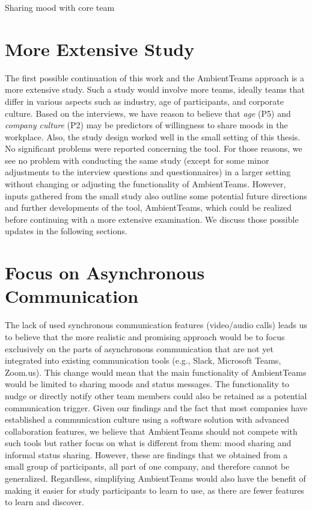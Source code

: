 Sharing mood with core team

\section{More Extensive Study}
The first possible continuation of this work and the AmbientTeams approach is a more extensive study. Such a study would involve more teams, ideally teams that differ in various aspects such as industry, age of participants, and corporate culture. Based on the interviews, we have reason to believe that \textit{age} (P5) and \textit{company culture} (P2) may be predictors of willingness to share moods in the workplace. Also, the study design worked well in the small setting of this thesis. No significant problems were reported concerning the tool. For those reasons, we see no problem with conducting the same study (except for some minor adjustments to the interview questions and questionnaires) in a larger setting without changing or adjusting the functionality of AmbientTeams. However, inputs gathered from the small study also outline some potential future directions and further developments of the tool, AmbientTeams, which could be realized before continuing with a more extensive examination. We discuss those possible updates in the following sections.


\section{Focus on Asynchronous Communication}
The lack of used synchronous communication features (video/audio calls) leads us to believe that the more realistic and promising approach would be to focus exclusively on the parts of asynchronous communication that are not yet integrated into existing communication tools (e.g., Slack, Microsoft Teams, Zoom.us). This change would mean that the main functionality of AmbientTeams would be limited to sharing moods and status messages. The functionality to nudge or directly notify other team members could also be retained as a potential communication trigger. Given our findings and the fact that most companies have established a communication culture using a software solution with advanced collaboration features, we believe that AmbientTeams should not compete with such tools but rather focus on what is different from them: mood sharing and informal status sharing. However, these are findings that we obtained from a small group of participants, all part of one company, and therefore cannot be generalized. Regardless, simplifying AmbientTeams would also have the benefit of making it easier for study participants to learn to use, as there are fewer features to learn and discover.

